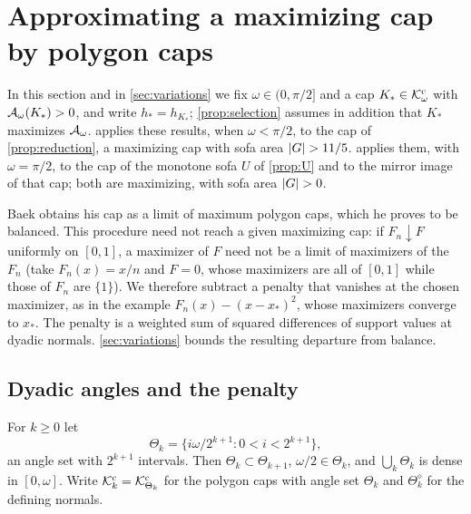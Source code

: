 \section{Approximating a maximizing cap by polygon caps}\label{sec:selection}

In this section and in \cref{sec:variations} we fix $\omega\in(0,\pi/2]$ and a
cap $K_*\in\mathcal{K}^{\mathrm{c}}_\omega$ with $\mathcal{A}_\omega(K_*)>0$, and write $h_*=h_{K_*}$;
\cref{prop:selection} assumes in addition that $K_*$ maximizes $\mathcal{A}_\omega$.
 applies these results, when $\omega<\pi/2$, to the cap of
\cref{prop:reduction}, a maximizing cap with sofa area $\lvert G\rvert>11/5$.
 applies them, with $\omega=\pi/2$, to the cap of the
monotone sofa $U$ of \cref{prop:U} and to the mirror image of that cap; both are
maximizing, with sofa area $\lvert G\rvert>0$.

Baek obtains his cap as a limit of maximum polygon caps, which he proves to be
balanced. This procedure need not reach a given maximizing cap: if
$F_n\downarrow F$ uniformly on $[0,1]$, a maximizer of $F$ need not be a limit
of maximizers of the $F_n$ (take $F_n(x)=x/n$ and $F=0$, whose maximizers are
all of $[0,1]$ while those of $F_n$ are $\{1\}$). We therefore subtract a
penalty that vanishes at the chosen maximizer, as in the example
$F_n(x)-(x-x_*)^2$, whose maximizers converge to $x_*$. The penalty is a
weighted sum of squared differences of support values at dyadic normals.
\cref{sec:variations} bounds the resulting departure from balance.

\subsection{Dyadic angles and the penalty}

For $k\ge0$ let
\[
  \Theta_k=\{i\omega/2^{k+1}:0<i<2^{k+1}\},
\]
an angle set with $2^{k+1}$ intervals. Then $\Theta_k\subset\Theta_{k+1}$,
$\omega/2\in\Theta_k$, and $\bigcup_k\Theta_k$ is dense in $[0,\omega]$. Write
$\mathcal{K}^{\mathrm{c}}_k=\mathcal{K}^{\mathrm{c}}_{\Theta_k}$ for the polygon caps with angle set $\Theta_k$ and
$\Theta_k^\diamond$ for the defining normals.

